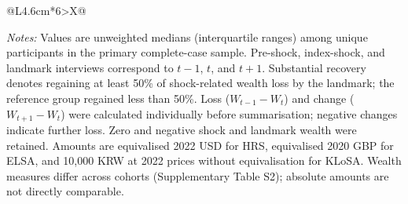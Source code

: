 \begin{landscape}
\begin{tabularx}{\linewidth}{@{}L{4.6cm}*{6}{>{\centering\arraybackslash}X}@{}}
\bottomrule
\end{tabularx}
\vspace{5pt}
\parbox{\linewidth}{\raggedright\fontsize{9}{11}\selectfont\textit{Notes:} Values are unweighted medians (interquartile ranges) among unique participants in the primary complete-case sample. Pre-shock, index-shock, and landmark interviews correspond to $t-1$, $t$, and $t+1$. Substantial recovery denotes regaining at least 50\% of shock-related wealth loss by the landmark; the reference group regained less than 50\%. Loss ($W_{t-1}-W_t$) and change ($W_{t+1}-W_t$) were calculated individually before summarisation; negative changes indicate further loss. Zero and negative shock and landmark wealth were retained. Amounts are equivalised 2022 USD for HRS, equivalised 2020 GBP for ELSA, and 10,000 KRW at 2022 prices without equivalisation for KLoSA. Wealth measures differ across cohorts (Supplementary Table S2); absolute amounts are not directly comparable.}
\endgroup
\end{landscape}
